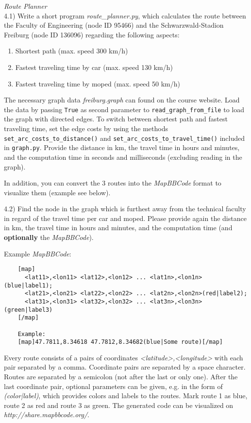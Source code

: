   \textit{Route Planner}\\
4.1)
Write a short program \emph{route\_planner.py}, which calculates the route between the Faculty of Engineering (node ID 95466) and the Schwarzwald-Stadion Freiburg (node ID 136096) regarding the following aspects:

\begin{enumerate} \itemsep-2pt
	\item Shortest path (max. speed 300 km/h)
	\item Fastest traveling time by car (max. speed 130 km/h)
	\item Fastest traveling time by moped (max. speed 50 km/h)
\end{enumerate}

The necessary graph data \emph{freiburg.graph} can found on the course website.
Load the data by passing \texttt{True} as second parameter to \texttt{read\_graph\_from\_file} to load the graph with directed edges.
To switch between shortest path and fastest traveling time, set the edge costs by using the methods \texttt{set\_arc\_costs\_to\_distance()} and \texttt{set\_arc\_costs\_to\_travel\_time()} included in \texttt{graph.py}.
Provide the distance in km, the travel time in hours and minutes, and the computation time in seconds and milliseconds (excluding reading in the graph).

In addition, you can convert the 3 routes into the \emph{MapBBCode} format to visualize them (example see below).

4.2)
Find the node in the graph which is furthest away from the technical
faculty in regard of the travel time per car and moped.
Please provide again the distance in km, the travel time in hours and minutes, and the computation time (and \textbf{optionally} the \emph{MapBBCode}).

Example \emph{MapBBCode}:
\begin{center}
  \small\begin{verbatim}
    [map]
      <lat11>,<lon11> <lat12>,<lon12> ... <lat1n>,<lon1n>(blue|label1);
      <lat21>,<lon21> <lat22>,<lon22> ... <lat2n>,<lon2n>(red|label2);
      <lat31>,<lon31> <lat32>,<lon32> ... <lat3n>,<lon3n>(green|label3)
    [/map]

    Example:
    [map]47.7811,8.34618 47.7812,8.34682(blue|Some route)[/map]
  \end{verbatim}
\end{center}

Every route consists of a pairs of coordinates \emph{<latitude>,<longitude>}
with each pair separated by a comma.
Coordinate pairs are separated by a space character. Routes are separated by
a semicolon (not after the last or only one).
After the last coordinate pair, optional parameters can be given, e.g. in the form of \emph{(color|label)}, which provides colors and labels to the routes.
Mark route 1 as blue, route 2 as red and route 3 as green.
The generated code can be visualized on \emph{http://share.mapbbcode.org/}.
